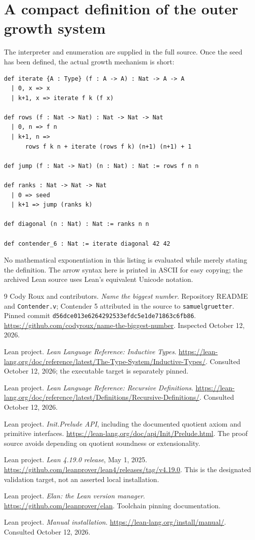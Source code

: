 \documentclass[11pt]{article}
\theoremstyle{definition}
\begin{document}
\section{A compact definition of the outer growth system}
The interpreter and enumeration are supplied in the full source. Once the seed
has been defined, the actual growth mechanism is short:
\begin{lstlisting}
def iterate {A : Type} (f : A -> A) : Nat -> A -> A
  | 0, x => x
  | k+1, x => iterate f k (f x)

def rows (f : Nat -> Nat) : Nat -> Nat -> Nat
  | 0, n => f n
  | k+1, n =>
      rows f k n + iterate (rows f k) (n+1) (n+1) + 1

def jump (f : Nat -> Nat) (n : Nat) : Nat := rows f n n

def ranks : Nat -> Nat -> Nat
  | 0 => seed
  | k+1 => jump (ranks k)

def diagonal (n : Nat) : Nat := ranks n n

def contender_6 : Nat := iterate diagonal 42 42
\end{lstlisting}
No mathematical exponentiation in this listing is evaluated while merely
stating the definition. The arrow syntax here is printed in ASCII for easy
copying; the archived Lean source uses Lean's equivalent Unicode notation.

\clearpage\begin{thebibliography}{9}
Cody Roux and contributors.
\emph{Name the biggest number}. Repository README and \texttt{Contender.v};
Contender 5 attributed in the source to \texttt{samuelgruetter}.
Pinned commit \texttt{d56dce013e6264292533efdc5e1de71863c6fb86}.
\url{https://github.com/codyroux/name-the-biggest-number}.
Inspected October 12, 2026.

Lean project. \emph{Lean Language Reference: Inductive Types}.
\url{https://lean-lang.org/doc/reference/latest/The-Type-System/Inductive-Types/}.
Consulted October 12, 2026; the executable target is separately pinned.

Lean project. \emph{Lean Language Reference: Recursive Definitions}.
\url{https://lean-lang.org/doc/reference/latest/Definitions/Recursive-Definitions/}.
Consulted October 12, 2026.

Lean project. \emph{Init.Prelude API}, including the documented quotient axiom
and primitive interfaces.
\url{https://lean-lang.org/doc/api/Init/Prelude.html}.
The proof source avoids depending on quotient soundness or extensionality.

Lean project. \emph{Lean 4.19.0 release}, May 1, 2025.
\url{https://github.com/leanprover/lean4/releases/tag/v4.19.0}.
This is the designated validation target, not an asserted local installation.

Lean project. \emph{Elan: the Lean version manager}.
\url{https://github.com/leanprover/elan}.
Toolchain pinning documentation.

Lean project. \emph{Manual installation}.
\url{https://lean-lang.org/install/manual/}.
Consulted October 12, 2026.
\end{thebibliography}
\end{document}
